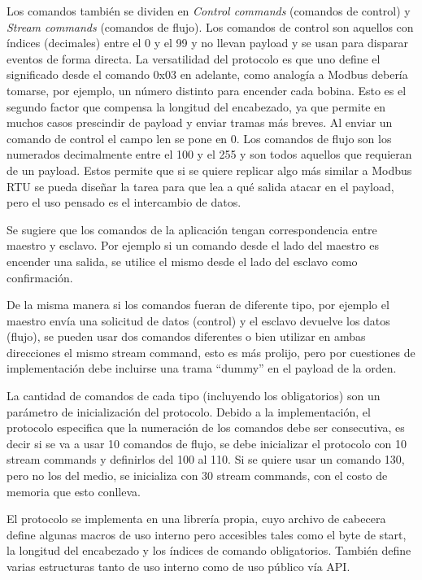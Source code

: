 Los comandos también se dividen en \textit{Control commands} (comandos de control) y \textit{Stream commands} (comandos de flujo). Los comandos de control son aquellos con índices (decimales) entre el 0 y el 99  y no llevan payload y se usan para disparar eventos de forma directa. La versatilidad del protocolo es que uno define el significado desde el comando 0x03 en adelante, como analogía a Modbus debería tomarse, por ejemplo, un número distinto para encender cada bobina. Esto es el segundo factor que compensa la longitud del encabezado, ya que permite en muchos casos prescindir de payload y enviar tramas más breves. Al enviar un comando de control el campo len se pone en 0.
Los comandos de flujo son los numerados decimalmente entre el 100 y el 255 y son todos aquellos que requieran de un payload. Estos permite que si se quiere replicar algo más similar a Modbus RTU se pueda diseñar la tarea para que lea a qué salida atacar en el payload, pero el uso pensado es el intercambio de datos.

Se sugiere que los comandos de la aplicación tengan correspondencia entre maestro y esclavo. Por ejemplo si un comando desde el lado del maestro es encender una salida, se utilice el mismo desde el lado del esclavo como confirmación.

De la misma manera si los comandos fueran de diferente tipo, por ejemplo el maestro envía una solicitud de datos (control) y el esclavo devuelve los datos (flujo), se pueden usar dos comandos diferentes o bien utilizar en ambas direcciones el mismo stream command, esto es más prolijo, pero por cuestiones de implementación debe incluirse una trama \enquote{dummy} en el payload de la orden.

La cantidad de comandos de cada tipo (incluyendo los obligatorios) son un parámetro de inicialización del protocolo. Debido a la implementación, el protocolo especifica que la numeración de los comandos debe ser consecutiva, es decir si se va a usar 10 comandos de flujo, se debe inicializar el protocolo con 10 stream commands y definirlos del 100 al 110.
Si se  quiere usar un comando 130, pero no los del medio, se inicializa con 30 stream commands, con el costo de memoria que esto conlleva.

El protocolo se implementa en una librería propia, cuyo archivo de cabecera define algunas macros de uso interno pero accesibles tales como el byte de start, la longitud del encabezado y los índices de comando obligatorios. También define varias estructuras tanto de uso interno como de uso público vía API.

